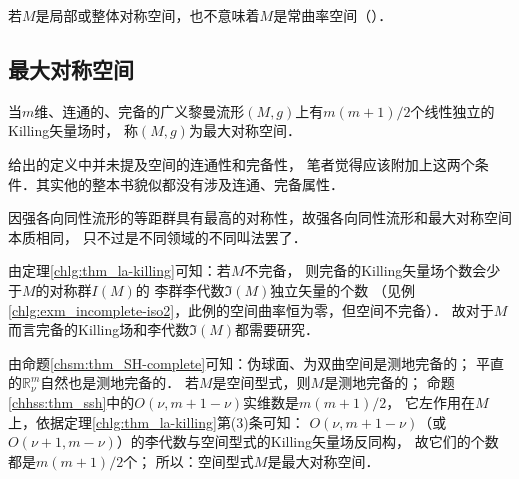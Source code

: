 若$M$是局部或整体对称空间，也不意味着$M$是常曲率空间（\parencite[Ch.12]{wolf_SCC-2011}）．





 

\subsection{最大对称空间}


\begin{definition}
    当$m$维、连通的、完备的广义黎曼流形$(M,g)$上有$m(m+1)/2$个线性独立的Killing矢量场时，
    称$(M,g)$为{\heiti 最大对称空间}．  %
\end{definition}

\textcite[\S 13.1]{weinberg_grav-1972}给出的定义中并未提及空间的连通性和完备性，
笔者觉得应该附加上这两个条件．其实他的整本书貌似都没有涉及连通、完备属性．

因强各向同性流形的等距群具有最高的对称性，故强各向同性流形和最大对称空间本质相同，
只不过是不同领域的不同叫法罢了．

由定理\ref{chlg:thm_la-killing}可知：若$M$不完备，
则完备的Killing矢量场个数会少于$M$的对称群$I(M)$的
李群李代数$\mathfrak{I}(M)$独立矢量的个数
（见例\ref{chlg:exm_incomplete-iso2}，此例的空间曲率恒为零，但空间不完备）．
故对于$M$而言完备的Killing场和李代数$\mathfrak{I}(M)$都需要研究．

由命题\ref{chsm:thm_SH-complete}可知：伪球面、为双曲空间是测地完备的；
平直的$\mathbb{R}^m_\nu$自然也是测地完备的．
若$M$是{\kaishu 空间型式}，则$M$是测地完备的；
命题\ref{chhss:thm_ssh}中的$O(\nu,m+1-\nu)$实维数是$m(m+1)/2$，
它左作用在$M$上，依据定理\ref{chlg:thm_la-killing}第(3)条可知：
$O(\nu,m+1-\nu)$（或$O(\nu+1,m-\nu)$）的李代数与空间型式的Killing矢量场反同构，
故它们的个数都是$m(m+1)/2$个；
所以：{\kaishu 空间型式$M$是最大对称空间}．





